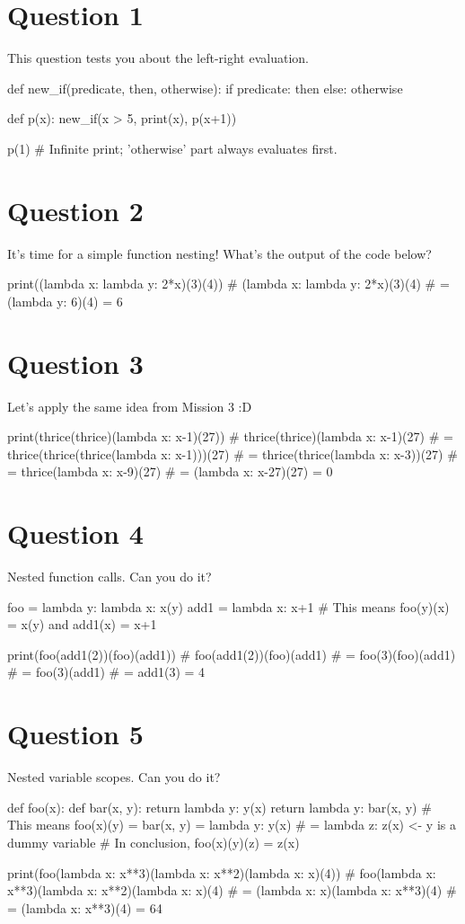 \section{Question 1}
This question tests you about the left-right evaluation.
\begin{python}
def new_if(predicate, then, otherwise):
    if predicate:
        then
    else:
        otherwise

def p(x):
    new_if(x > 5, print(x), p(x+1))

p(1) # Infinite print; 'otherwise' part always evaluates first.
\end{python}

\newpage

\section{Question 2}
It's time for a simple function nesting! What's the output of the code below?
\begin{python}
print((lambda x: lambda y: 2*x)(3)(4))
# (lambda x: lambda y: 2*x)(3)(4)
# = (lambda y: 6)(4) = 6
\end{python}

\section{Question 3}
Let's apply the same idea from Mission 3 :D
\begin{python}
print(thrice(thrice)(lambda x: x-1)(27))
# thrice(thrice)(lambda x: x-1)(27)
# = thrice(thrice(thrice(lambda x: x-1)))(27)
# = thrice(thrice(lambda x: x-3))(27)
# = thrice(lambda x: x-9)(27)
# = (lambda x: x-27)(27) = 0
\end{python}

\section{Question 4}
Nested function calls. Can you do it?
\begin{python}
foo = lambda y: lambda x: x(y)
add1 = lambda x: x+1
# This means foo(y)(x) = x(y) and add1(x) = x+1

print(foo(add1(2))(foo)(add1))
# foo(add1(2))(foo)(add1)
# = foo(3)(foo)(add1)
# = foo(3)(add1)
# = add1(3) = 4
\end{python}

\section{Question 5}
Nested variable scopes. Can you do it?
\begin{python}
def foo(x):
    def bar(x, y):
        return lambda y: y(x)
    return lambda y: bar(x, y)
# This means foo(x)(y) = bar(x, y) = lambda y: y(x)
#                                  = lambda z: z(x) <- y is a dummy variable
# In conclusion, foo(x)(y)(z) = z(x)

print(foo(lambda x: x**3)(lambda x: x**2)(lambda x: x)(4))
# foo(lambda x: x**3)(lambda x: x**2)(lambda x: x)(4)
# = (lambda x: x)(lambda x: x**3)(4)
# = (lambda x: x**3)(4) = 64
\end{python}


